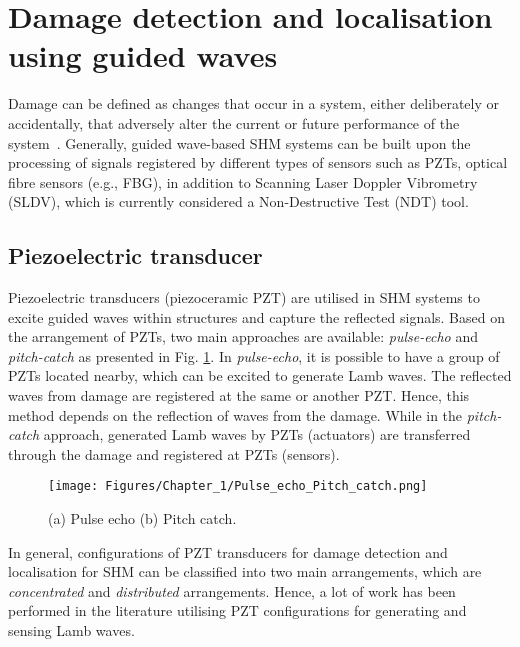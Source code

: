 \section[Damage identification]{Damage detection and localisation using guided waves}
\label{sec23}
Damage can be defined as changes that occur in a system, either deliberately or accident\-ally, that adversely alter the current or future performance of the system~\cite{Farrar2012}. 
Generally, guided wave-based SHM systems can be built upon the processing of signals registered by different types of sensors such as PZTs, optical fibre sensors (e.g., FBG), in addition to Scanning Laser Doppler Vibrometry (SLDV), which is currently considered a Non-Destructive Test (NDT) tool.
\subsection{Piezoelectric transducer} 
Piezoelectric transducers (piezoceramic PZT) are utilised in SHM systems to excite guided waves within structures and capture the reflected signals.
Based on the arrange\-ment of PZTs, two main approaches are available: \emph{pulse-echo} and \emph{pitch-catch} as presented in Fig. \ref{fig:Pulse_echo_Pitch_catch}.
In \emph{pulse-echo}, it is possible to have a group of PZTs located nearby, which can be excited to generate Lamb waves.
The reflected waves from damage are registered at the same or another PZT. 
Hence, this method depends on the reflection of waves from the damage.
While in the \emph{pitch-catch} approach, generated Lamb waves by PZTs (actuators) are transferred through the damage and registered at PZTs (sensors).
\begin{figure}[!ht]
	\begin{center}
		\centering
		\texttt{[image: Figures/Chapter\_1/Pulse\_echo\_Pitch\_catch.png]}
	\end{center}
	\caption{(a) Pulse echo	(b) Pitch catch.} 
	\label{fig:Pulse_echo_Pitch_catch}
\end{figure}

In general, configurations of PZT transducers for damage detection and localisation for SHM can be classified into two main arrangements, which are \emph{concentrated} and \emph{distributed} arrangements.
Hence, a lot of work has been performed in the literature utilising PZT configurations for generating and sensing Lamb waves.

